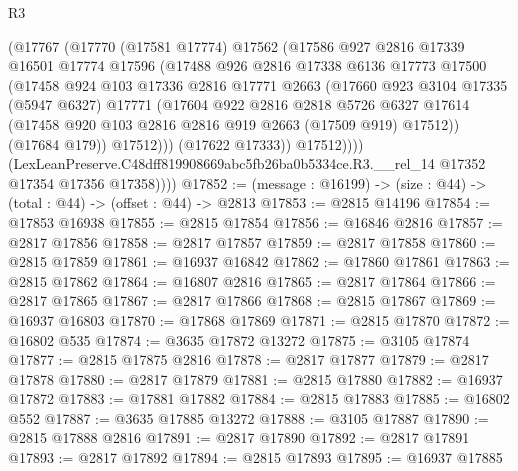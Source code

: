 \begin{lexlean}{R3}
\begin{coremodule}
                (@17767
                  (@17770
                    (@17581 @17774)
                    @17562
                    (@17586
                      @927
                      @2816
                      @17339
                      @16501
                      @17774
                      @17596
                      (@17488
                        @926
                        @2816
                        @17338
                        @6136
                        @17773
                        @17500
                        (@17458
                          @924
                          @103
                          @17336
                          @2816
                          @17771
                          @2663
                          (@17660
                            @923
                            @3104
                            @17335
                            (@5947 @6327)
                            @17771
                            (@17604
                              @922
                              @2816
                              @2818
                              @5726
                              @6327
                              @17614
                              (@17458 @920 @103 @2816 @2816 @919 @2663 (@17509 @919) @17512))
                            (@17684 @179))
                          @17512)))
                    (@17622 @17333))
                  @17512))))
          (LexLeanPreserve.C48dff819908669abc5fb26ba0b5334ce.R3.__rel_14
            @17352
            @17354
            @17356
            @17358))))
@17852 := (message : @16199) -> (size : @44) -> (total : @44) -> (offset : @44) -> @2813
@17853 := @2815 @14196
@17854 := @17853 @16938
@17855 := @2815 @17854
@17856 := @16846 @2816
@17857 := @2817 @17856
@17858 := @2817 @17857
@17859 := @2817 @17858
@17860 := @2815 @17859
@17861 := @16937 @16842
@17862 := @17860 @17861
@17863 := @2815 @17862
@17864 := @16807 @2816
@17865 := @2817 @17864
@17866 := @2817 @17865
@17867 := @2817 @17866
@17868 := @2815 @17867
@17869 := @16937 @16803
@17870 := @17868 @17869
@17871 := @2815 @17870
@17872 := @16802 @535
@17874 := @3635 @17872 @13272
@17875 := @3105 @17874
@17877 := @2815 @17875 @2816
@17878 := @2817 @17877
@17879 := @2817 @17878
@17880 := @2817 @17879
@17881 := @2815 @17880
@17882 := @16937 @17872
@17883 := @17881 @17882
@17884 := @2815 @17883
@17885 := @16802 @552
@17887 := @3635 @17885 @13272
@17888 := @3105 @17887
@17890 := @2815 @17888 @2816
@17891 := @2817 @17890
@17892 := @2817 @17891
@17893 := @2817 @17892
@17894 := @2815 @17893
@17895 := @16937 @17885

\end{coremodule}
\end{lexlean}
